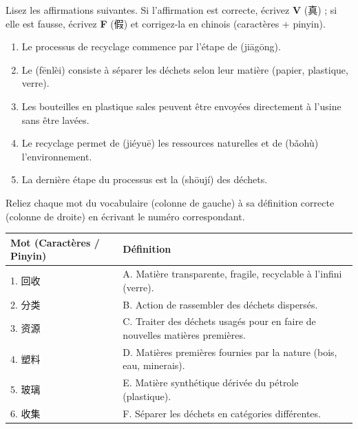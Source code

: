 \documentclass[11pt]{article}
\newcommand{\zh}[1]{\ifmmode\text{#1}\else{#1}\fi}
\begin{document}
\begin{exercice}
Lisez les affirmations suivantes. Si l'affirmation est correcte, écrivez \textbf{V} (真) ; si elle est fausse, écrivez \textbf{F} (假) et corrigez-la en chinois (caractères + pinyin).
\begin{enumerate}
    \item Le processus de recyclage commence par l'étape de \zh{加工} (jiāgōng).
    \item Le \zh{分类} (fēnlèi) consiste à séparer les déchets selon leur matière (papier, plastique, verre).
    \item Les bouteilles en plastique sales peuvent être envoyées directement à l'usine sans être lavées.
    \item Le recyclage permet de \zh{节约} (jiéyuē) les ressources naturelles et de \zh{保护} (bǎohù) l'environnement.
    \item La dernière étape du processus est la \zh{收集} (shōují) des déchets.
\end{enumerate}
\end{exercice}

\begin{exercice}
Reliez chaque mot du vocabulaire (colonne de gauche) à sa définition correcte (colonne de droite) en écrivant le numéro correspondant.
\begin{center}
\begin{tabularx}{\linewidth}{|X|X|}
\hline
\rowcolor{popblueL} \textbf{Mot (Caractères / Pinyin)} & \textbf{Définition} \\ \hline
1. 回收  & A. Matière transparente, fragile, recyclable à l'infini (verre). \\ \hline
2. 分类  & B. Action de rassembler des déchets dispersés. \\ \hline
3. 资源  & C. Traiter des déchets usagés pour en faire de nouvelles matières premières. \\ \hline
4. 塑料  & D. Matières premières fournies par la nature (bois, eau, minerais). \\ \hline
5. 玻璃  & E. Matière synthétique dérivée du pétrole (plastique). \\ \hline
6. 收集  & F. Séparer les déchets en catégories différentes. \\ \hline
\end{tabularx}
\end{center}
\end{exercice}
\end{document}
